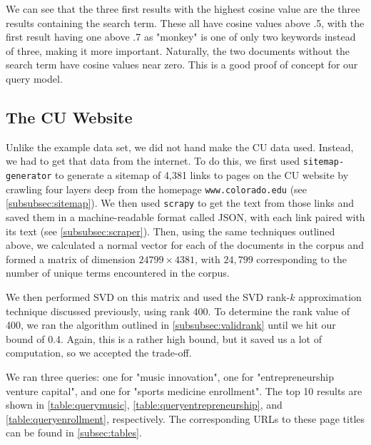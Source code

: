 We can see that the three first results with the highest cosine value are the three results containing the search term. These all have cosine values above .5, with the first result having one above .7 as "monkey" is one of only two keywords instead of three, making it more important. Naturally, the two documents without the search term have cosine values near zero. 
This is a good proof of concept for our query model.


\subsection{The CU Website}\label{subsec:cuwebsite}
Unlike the example data set, we did not hand make the CU data used. Instead, we had to get that data from the internet. To do this, we first used \verb|sitemap-generator| to generate a sitemap of 4,381 links to pages on the CU website by crawling four layers deep from the homepage \verb|www.colorado.edu| (see \autoref{subsubsec:sitemap}). We then used \verb|scrapy| to get the text from those links
and saved them in a machine-readable format called JSON, with each link paired with its text (see \autoref{subsubsec:scraper}). Then, using the same techniques outlined above, we calculated a normal vector for each of the documents in the corpus and formed a matrix of dimension $24799\times4381$, with $24,799$ corresponding to the number of unique terms encountered in the corpus.

We then performed SVD on this matrix and used the SVD rank-$k$ approximation technique discussed previously, using rank 400. To determine the rank value of 400, we ran the algorithm outlined in \autoref{subsubsec:validrank} until we hit our bound of 0.4. Again, this is a rather high bound, but it saved us a lot of computation, so we accepted the trade-off. 


We ran three queries: one for "music innovation", one for "entrepreneurship venture capital", and one for "sports medicine enrollment". The top 10 results are shown in \autoref{table:querymusic}, \autoref{table:queryentrepreneurship}, and \autoref{table:queryenrollment}, respectively. The corresponding URLs to these page titles can be found in \autoref{subsec:tables}.

